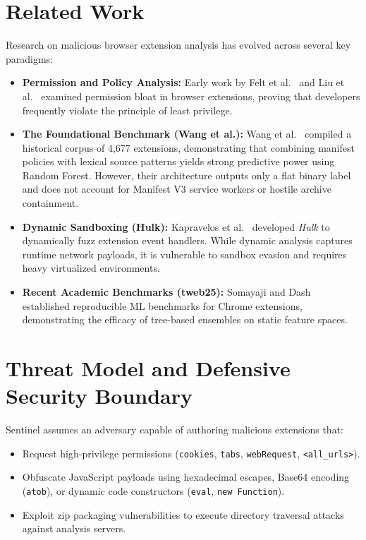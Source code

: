 \documentclass[conference]{IEEEtran}
\begin{document}
\section{Related Work}
Research on malicious browser extension analysis has evolved across several key paradigms:
\begin{itemize}
    \item \textbf{Permission and Policy Analysis:} Early work by Felt et al.~\cite{felt2011} and Liu et al.~\cite{liu2012} examined permission bloat in browser extensions, proving that developers frequently violate the principle of least privilege.
    \item \textbf{The Foundational Benchmark (Wang et al.):} Wang et al.~\cite{wang2018} compiled a historical corpus of 4,677 extensions, demonstrating that combining manifest policies with lexical source patterns yields strong predictive power using Random Forest. However, their architecture outputs only a flat binary label and does not account for Manifest V3 service workers or hostile archive containment.
    \item \textbf{Dynamic Sandboxing (Hulk):} Kapravelos et al.~\cite{kapravelos2014} developed \emph{Hulk} to dynamically fuzz extension event handlers. While dynamic analysis captures runtime network payloads, it is vulnerable to sandbox evasion and requires heavy virtualized environments.
    \item \textbf{Recent Academic Benchmarks (tweb25):} Somayaji and Dash~\cite{somayaji2024} established reproducible ML benchmarks for Chrome extensions, demonstrating the efficacy of tree-based ensembles on static feature spaces.
\end{itemize}

\section{Threat Model and Defensive Security Boundary}
Sentinel assumes an adversary capable of authoring malicious extensions that:
\begin{itemize}
    \item Request high-privilege permissions (\texttt{cookies}, \texttt{tabs}, \texttt{webRequest}, \texttt{<all\_urls>}).
    \item Obfuscate JavaScript payloads using hexadecimal escapes, Base64 encoding (\texttt{atob}), or dynamic code constructors (\texttt{eval}, \texttt{new Function}).
    \item Exploit zip packaging vulnerabilities to execute directory traversal attacks against analysis servers.
\end{itemize}
\end{document}
